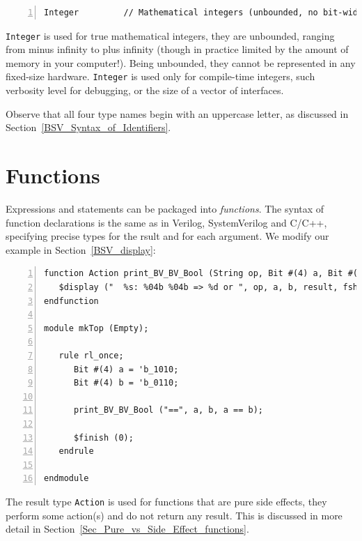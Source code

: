 {\footnotesize
\begin{Verbatim}[frame=single, numbers=left]
   Integer         // Mathematical integers (unbounded, no bit-width limit)
\end{Verbatim}
}

\verb|Integer| is used for true mathematical integers, {\ie} they are
unbounded, ranging from minus infinity to plus infinity (though in
practice limited by the amount of memory in your computer!).  Being
unbounded, they cannot be represented in any fixed-size hardware.
\verb|Integer| is used only for compile-time integers, such verbosity
level for debugging, or the size of a vector of interfaces.

Observe that all four type names begin with an uppercase letter, as
discussed in Section~\ref{BSV_Syntax_of_Identifiers}.


\section{Functions}

\label{BSV_functions}


Expressions and statements can be packaged into \emph{functions}.  The
syntax of {\BSV} function declarations is the same as in Verilog,
SystemVerilog and C/C++, specifying precise types for the rsult and
for each argument.  We modify our example in
Section~\ref{BSV_display}:

{\footnotesize
\begin{Verbatim}[frame=single, numbers=left]
function Action print_BV_BV_Bool (String op, Bit #(4) a, Bit #(4) b, Bool result);
   $display ("  %s: %04b %04b => %d or ", op, a, b, result, fshow (result));
endfunction

module mkTop (Empty);

   rule rl_once;
      Bit #(4) a = 'b_1010;
      Bit #(4) b = 'b_0110;

      print_BV_BV_Bool ("==", a, b, a == b);

      $finish (0);
   endrule

endmodule
\end{Verbatim}
}

The result type \verb|Action| is used for functions that are pure side
effects, {\ie} they perform some action(s) and do not return any
result.  This is discussed in more detail in
Section~\ref{Sec_Pure_vs_Side_Effect_functions}.

